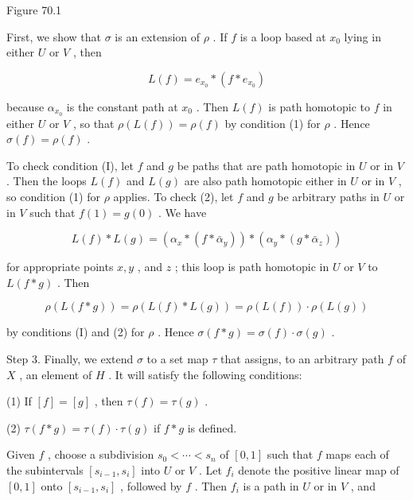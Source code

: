 Figure 70.1

First, we show that \(\sigma\) is an extension of \(\rho\) . If \(f\) is a loop based at \({x}_{0}\) lying in either \(U\) or \(V\) , then

\[
L\left( f\right)  = {e}_{{x}_{0}} * \left( {f * {e}_{{x}_{0}}}\right)
\]

because \({\alpha }_{{x}_{0}}\) is the constant path at \({x}_{0}\) . Then \(L\left( f\right)\) is path homotopic to \(f\) in either \(U\) or \(V\) , so that \(\rho \left( {L\left( f\right) }\right)  = \rho \left( f\right)\) by condition (1) for \(\rho\) . Hence \(\sigma \left( f\right)  = \rho \left( f\right)\) .

To check condition (I), let \(f\) and \(g\) be paths that are path homotopic in \(U\) or in \(V\) . Then the loops \(L\left( f\right)\) and \(L\left( g\right)\) are also path homotopic either in \(U\) or in \(V\) , so condition (1) for \(\rho\) applies. To check (2), let \(f\) and \(g\) be arbitrary paths in \(U\) or in \(V\) such that \(f\left( 1\right)  = g\left( 0\right)\) . We have

\[
L\left( f\right)  * L\left( g\right)  = \left( {{\alpha }_{x} * \left( {f * {\bar{\alpha }}_{y}}\right) }\right)  * \left( {{\alpha }_{y} * \left( {g * {\bar{\alpha }}_{z}}\right) }\right)
\]

for appropriate points \(x,y\) , and \(z\) ; this loop is path homotopic in \(U\) or \(V\) to \(L\left( {f * g}\right)\) . Then

\[
\rho \left( {L\left( {f * g}\right) }\right)  = \rho \left( {L\left( f\right)  * L\left( g\right) }\right)  = \rho \left( {L\left( f\right) }\right)  \cdot  \rho \left( {L\left( g\right) }\right)
\]

by conditions (I) and (2) for \(\rho\) . Hence \(\sigma \left( {f * g}\right)  = \sigma \left( f\right)  \cdot  \sigma \left( g\right)\) .

Step 3. Finally, we extend \(\sigma\) to a set map \(\tau\) that assigns, to an arbitrary path \(f\) of \(X\) , an element of \(H\) . It will satisfy the following conditions:

(1) If \(\left\lbrack  f\right\rbrack   = \left\lbrack  g\right\rbrack\) , then \(\tau \left( f\right)  = \tau \left( g\right)\) .

(2) \(\tau \left( {f * g}\right)  = \tau \left( f\right)  \cdot  \tau \left( g\right)\) if \(f * g\) is defined.

Given \(f\) , choose a subdivision \({s}_{0} < \cdots  < {s}_{n}\) of \(\left\lbrack  {0,1}\right\rbrack\) such that \(f\) maps each of the subintervals \(\left\lbrack  {{s}_{i - 1},{s}_{i}}\right\rbrack\) into \(U\) or \(V\) . Let \({f}_{i}\) denote the positive linear map of \(\left\lbrack  {0,1}\right\rbrack\) onto \(\left\lbrack  {{s}_{i - 1},{s}_{i}}\right\rbrack\) , followed by \(f\) . Then \({f}_{i}\) is a path in \(U\) or in \(V\) , and

